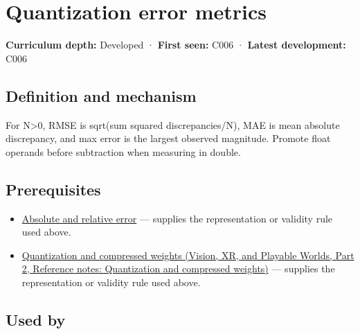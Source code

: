 \hypertarget{appendix-537171d69d27}{}\label{referencestart:appendix-537171d69d27}
\section{Quantization error metrics}\label{appendix-537171d69d27-quantization-error-metrics}

\hypertarget{appendix-537171d69d27-quantization-error-metrics}{}

\textbf{Curriculum depth:} Developed · \textbf{First seen:} C006 · \textbf{Latest development:} C006

\begin{allmightroledefinition}

\subsection{Definition and mechanism}\label{appendix-537171d69d27-definition-and-mechanism}

\hypertarget{appendix-537171d69d27-definition-and-mechanism}{}

For N\textgreater0, RMSE is sqrt(sum squared discrepancies/N), MAE is mean absolute discrepancy, and max error is the largest observed magnitude. Promote float operands before subtraction when measuring in double.

\end{allmightroledefinition}

\subsection{Prerequisites}\label{appendix-537171d69d27-prerequisites}

\hypertarget{appendix-537171d69d27-prerequisites}{}

\begin{itemize}
\tightlist
\item
  \hyperref[appendix-3ae74e89b4e6]{Absolute and relative error} --- supplies the representation or validity rule used above.
\item
  \href{../07-Vision-XR-and-Playable-Worlds-P02/main.pdf\#appendix-fdc7879e8bf2}{Quantization and compressed weights (Vision, XR, and Playable Worlds, Part 2, Reference notes: Quantization and compressed weights)} --- supplies the representation or validity rule used above.
\end{itemize}

\subsection{Used by}\label{appendix-537171d69d27-used-by}

